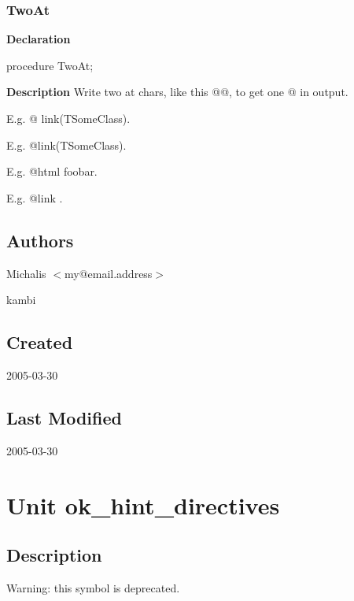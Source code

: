 \documentclass{report}
\begin{document}
\subsection*{TwoAt}
\begin{list}{}{
\setlength{\itemindent}{0cm}
\setlength{\listparindent}{0cm}
\setlength{\leftmargin}{\evensidemargin}
\addtolength{\leftmargin}{\tmplength}
\settowidth{\labelsep}{X}
\addtolength{\leftmargin}{\labelsep}
\setlength{\labelwidth}{\tmplength}
}
\begin{flushleft}
\item[\textbf{Declaration}\hfill]
\begin{ttfamily}
procedure TwoAt;\end{ttfamily}


\end{flushleft}
\par
\item[\textbf{Description}]
Write two at chars, like this @@, to get one @ in output.

E.g. @ link(TSomeClass).

E.g. @link(TSomeClass).

E.g. @html foobar.

E.g. @link .

\end{list}
\section{Authors}
\par
Michalis {$<$}my@email.address{$>$}

\par
kambi

\section{Created}
\par
2005{-}03{-}30


\section{Last Modified}
\par
2005{-}03{-}30


\chapter{Unit ok{\_}hint{\_}directives}
\section{Description}
Warning: this symbol is deprecated.
\end{document}
